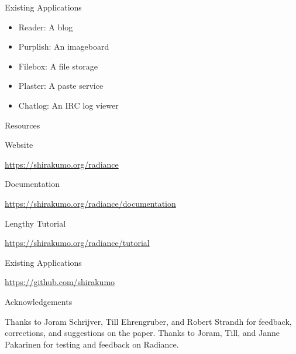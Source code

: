\documentclass[14pt]{beamer}
\renewcommand{\title}[1]{
  {\huge #1} \vskip 0.4cm
}
\renewcommand{\subtitle}[1]{
  \vskip 0.3cm {\Large #1} \vskip 0.2cm %
}
\begin{document}
\begin{frame}
  \title{Existing Applications}
  \begin{itemize}
  \item Reader: A blog
  \item Purplish: An imageboard
  \item Filebox: A file storage
  \item Plaster: A paste service
  \item Chatlog: An IRC log viewer
  \end{itemize}
\end{frame}

\begin{frame}
  \title{Resources}
  \subtitle{Website}
  {\footnotesize\url{https://shirakumo.org/radiance}}
  \subtitle{Documentation}
  {\footnotesize\url{https://shirakumo.org/radiance/documentation}}
  \subtitle{Lengthy Tutorial}
  {\footnotesize\url{https://shirakumo.org/radiance/tutorial}}
  \subtitle{Existing Applications}
  {\footnotesize\url{https://github.com/shirakumo}}
\end{frame}

\begin{frame}
  \title{Acknowledgements}
  
  Thanks to Joram Schrijver, Till Ehrengruber, and Robert Strandh for feedback, corrections, and suggestions on the paper. Thanks to Joram, Till, and Janne Pakarinen for testing and feedback on Radiance.
\end{frame}
\end{document}
